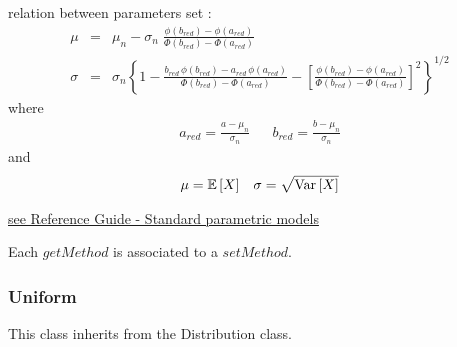 \begin{description}
\begin{description}
  \item relation between parameters set :
    \begin{eqnarray*}
      \mu                                       &       =       &   \mu_n -
      \sigma_n \;
      \frac{\phi(b_{red}) - \phi(a_{red})}
      {\Phi(b_{red}) - \Phi(a_{red})}   \\
      \sigma            &  =    &       \sigma_n
      \left\{
        1
        -
        \frac{b_{red}\,\phi(b_{red}) - a_{red}\,\phi(a_{red})}
        {\Phi(b_{red}) - \Phi(a_{red})}
        -
        \left[
          \frac{\phi(b_{red}) - \phi(a_{red})}
          {\Phi(b_{red}) - \Phi(a_{red})}
        \right]^2
      \right\}^{1/2}
    \end{eqnarray*}
    where
    \begin{eqnarray*}
      a_{red} = \frac{a - \mu_n}{\sigma_n} &&
      b_{red} = \frac{b - \mu_n}{\sigma_n}
    \end{eqnarray*}
    and
    \begin{align*}
      \mu = {\mathbb E}\left[ X \right]
      &&
      \sigma = \sqrt{{\rm Var}\left[ X \right] }
    \end{align*}
  \end{description}

\item[Links :]  \rule{0pt}{1em}
  \href{OpenTURNS_ReferenceGuide.pdf}{see Reference Guide - Standard parametric models}
\end{description}




Each  $getMethod$  is associated to a $setMethod$.

\newpage \subsubsection{Uniform}

This class inherits from the Distribution class.

